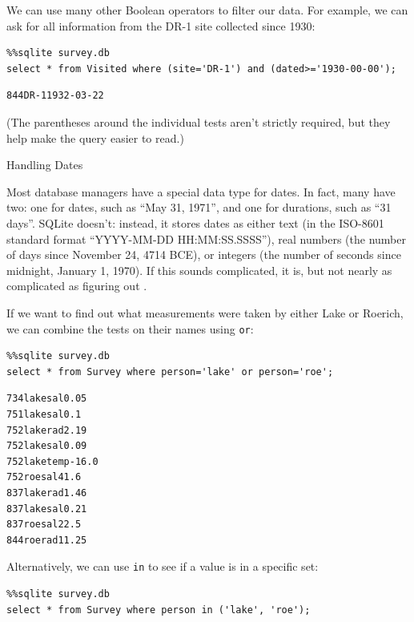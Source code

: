 \documentclass{book}
\begin{document}
We can use many other Boolean operators to filter our data. For example,
we can ask for all information from the DR-1 site collected since 1930:

\begin{verbatim}
%%sqlite survey.db
select * from Visited where (site='DR-1') and (dated>='1930-00-00');
\end{verbatim}

\begin{verbatim}
844DR-11932-03-22
\end{verbatim}

(The parentheses around the individual tests aren't strictly required,
but they help make the query easier to read.)

\begin{swcbox}{Handling Dates}

Most database managers have a special data type for dates. In fact, many
have two: one for dates, such as ``May 31, 1971'', and one for
durations, such as ``31 days''. SQLite doesn't: instead, it stores dates
as either text (in the ISO-8601 standard format ``YYYY-MM-DD
HH:MM:SS.SSSS''), real numbers (the number of days since November 24,
4714 BCE), or integers (the number of seconds since midnight, January 1,
1970). If this sounds complicated, it is, but not nearly as complicated
as figuring out
.

\end{swcbox}

If we want to find out what measurements were taken by either Lake or
Roerich, we can combine the tests on their names using \texttt{or}:

\begin{verbatim}
%%sqlite survey.db
select * from Survey where person='lake' or person='roe';
\end{verbatim}

\begin{verbatim}
734lakesal0.05
751lakesal0.1
752lakerad2.19
752lakesal0.09
752laketemp-16.0
752roesal41.6
837lakerad1.46
837lakesal0.21
837roesal22.5
844roerad11.25
\end{verbatim}

Alternatively, we can use \texttt{in} to see if a value is in a specific
set:

\begin{verbatim}
%%sqlite survey.db
select * from Survey where person in ('lake', 'roe');
\end{verbatim}
\end{document}
